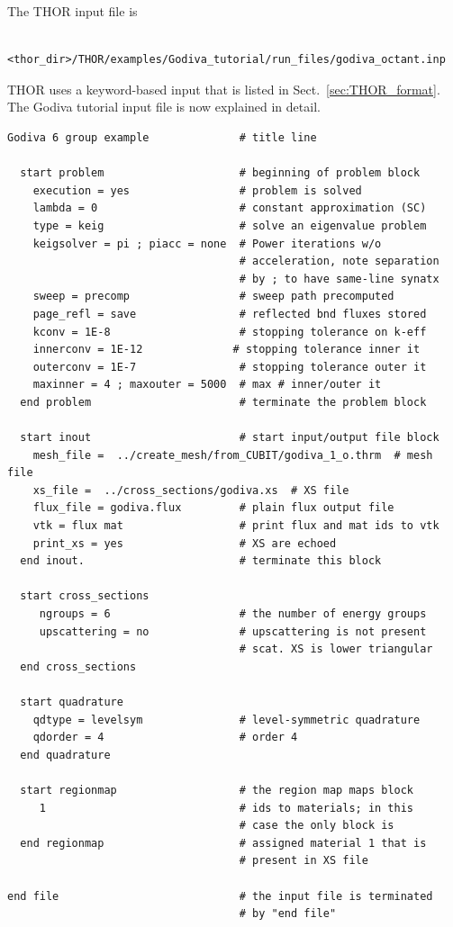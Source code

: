 The THOR input file is
\begin{verbatim}
   <thor_dir>/THOR/examples/Godiva_tutorial/run_files/godiva_octant.inp
\end{verbatim}
THOR uses a keyword-based input that is listed in Sect.~\ref{sec:THOR_format}.
The Godiva tutorial input file is now explained in detail.
\begin{verbatim}
Godiva 6 group example              # title line

  start problem                     # beginning of problem block
    execution = yes                 # problem is solved
    lambda = 0                      # constant approximation (SC)
    type = keig                     # solve an eigenvalue problem
    keigsolver = pi ; piacc = none  # Power iterations w/o
                                    # acceleration, note separation
                                    # by ; to have same-line synatx
    sweep = precomp                 # sweep path precomputed
    page_refl = save                # reflected bnd fluxes stored
    kconv = 1E-8                    # stopping tolerance on k-eff
    innerconv = 1E-12              # stopping tolerance inner it
    outerconv = 1E-7                # stopping tolerance outer it
    maxinner = 4 ; maxouter = 5000  # max # inner/outer it
  end problem                       # terminate the problem block

  start inout                       # start input/output file block
    mesh_file =  ../create_mesh/from_CUBIT/godiva_1_o.thrm  # mesh file
    xs_file =  ../cross_sections/godiva.xs  # XS file
    flux_file = godiva.flux         # plain flux output file
    vtk = flux mat                  # print flux and mat ids to vtk
    print_xs = yes                  # XS are echoed
  end inout.                        # terminate this block

  start cross_sections
     ngroups = 6                    # the number of energy groups
     upscattering = no              # upscattering is not present
                                    # scat. XS is lower triangular
  end cross_sections

  start quadrature
    qdtype = levelsym               # level-symmetric quadrature
    qdorder = 4                     # order 4
  end quadrature

  start regionmap                   # the region map maps block
     1                              # ids to materials; in this
                                    # case the only block is
  end regionmap                     # assigned material 1 that is
                                    # present in XS file

end file                            # the input file is terminated
                                    # by "end file"
\end{verbatim}

